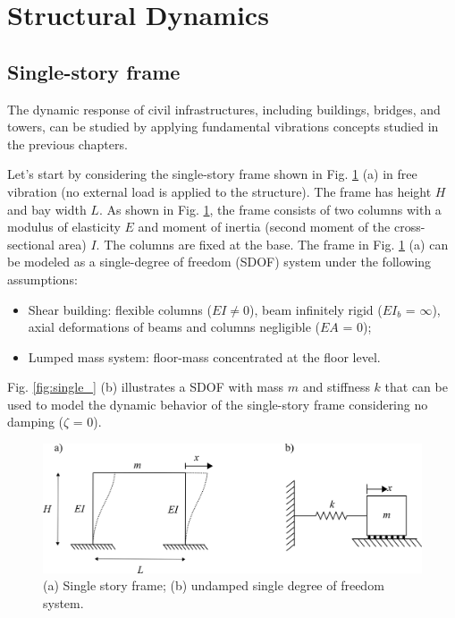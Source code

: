 \documentclass[12pt,letter]{article}
\numberwithin{ex}{section} %
\numberwithin{re}{section} %
\begin{document}
	
	\setcounter{section}{6}	
	\setcounter{figure}{0}   
	\renewcommand\thefigure{\thesection.\arabic{figure}}
	\setcounter{equation}{0}   
	\renewcommand\theequation{\thesection.\arabic{equation}}	
	
	\section{Structural Dynamics}	
	
	\subsection{Single-story frame}


The dynamic response of civil infrastructures, including buildings, bridges, and towers, can be studied by applying fundamental vibrations concepts studied in the previous chapters. 

Let's start by considering the single-story frame shown in Fig. \ref{fig:one_story_frame_example} (a) in free vibration (no external load is applied to the structure). The frame has height $H$ and bay width $L$. As shown in Fig. \ref{fig:one_story_frame_example}, the frame consists of two columns with a modulus of elasticity $E$ and moment of inertia (second moment of the cross-sectional area) $I$. The columns are fixed at the base. The frame in Fig. \ref{fig:one_story_frame_example} (a) can be modeled as a single-degree of freedom (SDOF) system under the following assumptions:

\begin{itemize}
	\item Shear building: flexible columns ($EI \neq 0$), beam infinitely rigid ($EI_b$ = $\infty$), axial deformations of beams and columns negligible ($EA$ = 0);
	\item Lumped mass system: floor-mass concentrated at the floor level.
\end{itemize}

Fig. \ref{fig:single_} (b) illustrates a SDOF with mass $m$ and stiffness $k$ that can be used to model the dynamic behavior of the single-story frame considering no damping ($\zeta$ = 0). 

\begin{figure}[H]
	\centering
	\includegraphics{../figures/Single_story_frame.png}
	\caption{(a) Single story frame; (b) undamped single degree of freedom system.}
	\label{fig:one_story_frame_example}
\end{figure}
\end{document}
